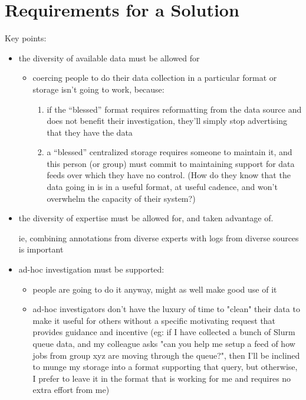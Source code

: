\section{Requirements for a Solution}
\label{s:requirements}

Key points:

\begin{itemize}
\item the diversity of available data must be allowed for
\begin{itemize}
\item coercing people to do their data collection in a particular format
      or storage isn't going to work, because:
      
\begin{enumerate}
\item if the ``blessed'' format requires reformatting from the data source
      and does not benefit their investigation, they'll simply stop 
      advertising that they have the data
\item a ``blessed'' centralized storage requires someone to maintain it,
      and this person (or group) must commit to maintaining support for 
      data feeds over which they have no control. (How do they know that 
      the data going in is in a useful format, at useful cadence, and
      won't overwhelm the capacity of their system?)
\end{enumerate}
\end{itemize}

\item the diversity of expertise must be allowed for, and taken advantage of.

      ie, combining annotations from diverse experts with logs from diverse 
      sources is important
      
\item ad-hoc investigation must be supported:
\begin{itemize}
\item people are going to do it anyway, might as well make good use of it
\item ad-hoc investigators don't have the luxury of time to "clean" their 
      data to make it useful for others without a specific motivating 
      request that provides guidance and incentive
      (eg: if I have collected a bunch of Slurm queue data, and my colleague 
      asks "can you help me setup a feed of how jobs from group xyz are moving 
      through the queue?", then I'll be inclined to munge my storage into a 
      format supporting that query, but otherwise, I prefer to leave it in the 
      format that is working for me and requires no extra effort from me)
\end{itemize}


\end{itemize}

